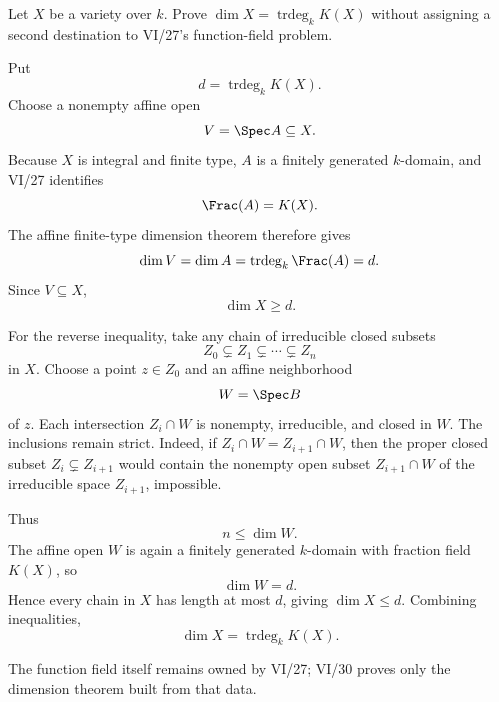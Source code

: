 \begin{problem}\label{prob:vi30-12}
Let \(X\) be a variety over \(k\). Prove \(\dim X=\operatorname{trdeg}_kK(X)\) without assigning a second destination to VI/27's function-field problem.

\end{problem}

\ifdefined\FullProblemDossiers
\begin{solution}
Put
\[
d=\operatorname{trdeg}_kK(X).
\]
Choose a nonempty affine open
\[
V=\Spec A\subseteq X.
\]
Because \(X\) is integral and finite type, \(A\) is a finitely generated \(k\)-domain, and VI/27 identifies
\[
\Frac(A)=K(X).
\]
The affine finite-type dimension theorem therefore gives
\[
\dim V=\dim A=\operatorname{trdeg}_k\Frac(A)=d.
\]
Since \(V\subseteq X\),
\[
\dim X\ge d.
\]

For the reverse inequality, take any chain of irreducible closed subsets
\[
Z_0\subsetneq Z_1\subsetneq\cdots\subsetneq Z_n
\]
in \(X\). Choose a point \(z\in Z_0\) and an affine neighborhood
\[
W=\Spec B
\]
of \(z\). Each intersection \(Z_i\cap W\) is nonempty, irreducible, and closed in \(W\). The inclusions remain
strict. Indeed, if \(Z_i\cap W=Z_{i+1}\cap W\), then the proper closed subset \(Z_i\subsetneq Z_{i+1}\) would
contain the nonempty open subset \(Z_{i+1}\cap W\) of the irreducible space \(Z_{i+1}\), impossible.

Thus
\[
n\le\dim W.
\]
The affine open \(W\) is again a finitely generated \(k\)-domain with fraction field \(K(X)\), so
\[
\dim W=d.
\]
Hence every chain in \(X\) has length at most \(d\), giving \(\dim X\le d\). Combining inequalities,
\[
\boxed{\dim X=\operatorname{trdeg}_kK(X)}.
\]

The function field itself remains owned by VI/27; VI/30 proves only the dimension theorem built from that data.
\end{solution}
\fi
